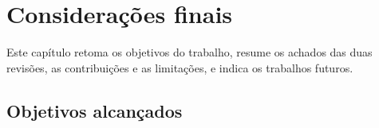 \begingroup
\setlength{\emergencystretch}{3em}

\chapter{Considerações finais}
\label{cap:consideracoes}

Este capítulo retoma os objetivos do trabalho, resume os achados das duas
revisões, as contribuições e as limitações, e indica os trabalhos futuros.

\section{Objetivos alcançados}
\label{sec:consideracoes-objetivos}

